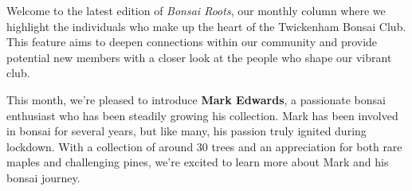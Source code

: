 \label{2025-03-roots}
\noindent
Welcome to the latest edition of \emph{Bonsai Roots}, our monthly column where we highlight the individuals who make up the heart of the Twickenham Bonsai Club.
This feature aims to deepen connections within our community and provide potential new members with a closer look at the people who shape our vibrant club.

This month, we're pleased to introduce \textbf{Mark Edwards}, a passionate bonsai enthusiast who has been steadily growing his collection.
Mark has been involved in bonsai for several years, but like many, his passion truly ignited during lockdown.
With a collection of around 30 trees and an appreciation for both rare maples and challenging pines, we're excited to learn more about Mark and his bonsai journey.

